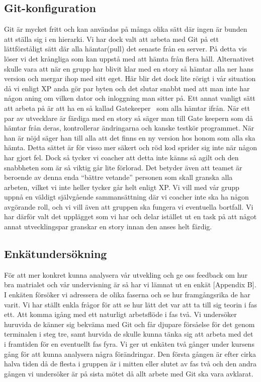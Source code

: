 \subsection{Git-konfiguration}

Git är mycket fritt och kan användas på många olika sätt där ingen är bunden att ställa sig i en hierarki. Vi har dock valt att arbeta med Git på ett lättförståligt sätt där alla hämtar(pull) det senaste från en server. På detta vis löser vi det krångliga som kan uppstå med att hämta från flera håll. Alternativet skulle vara att när en grupp har blivit klar med en story så hämtar alla ner hans version och mergar ihop med sitt eget. Här blir det dock lite rörigt i vår situation då vi enligt XP anda gör par byten och det slutar snabbt med att man inte har någon aning om vilken dator och inloggning man sitter på. Ett annat vanligt sätt att arbeta på är att ha en så kallad Gatekeeper~\cite{Gatekeeper} som alla hämtar ifrån. När ett par av utvecklare är färdiga med en story så säger man till Gate keepern som då hämtar från deras, kontrollerar ändringarna och kanske testkör programmet. När han är nöjd säger han till alla att det finns en ny version hos honom som alla ska hämta. Detta sättet är för visso mer säkert och röd kod sprider sig inte när någon har gjort fel. Dock så tycker vi coacher att detta inte känns så agilt och den snabbheten som är så viktig går lite förlorad. Det betyder även att teamet är beroende av denna enda “bättre vetande” personen som skall granska alla arbeten, vilket vi inte heller tycker går helt enligt XP. Vi vill med vår grupp uppnå en väldigt självgående sammansättning där vi coacher inte ska ha någon avgörande roll, och vi vill även att gruppen ska fungera vi eventuella bortfall. 
Vi har därför valt det upplägget som vi har och delar istället ut en task på att något annat utvecklingspar granskar en story innan den anses helt färdig. 


\subsection{Enkätundersökning}

För att mer konkret kunna analysera vår utvekling och ge oss feedback om hur bra matrialet och vår undervisning är så har vi lämnat ut en enkät [Appendix B]. I enkäten försöker vi adressera de olika faserna och se hur framgångsrika de har varit. Vi har ställt enkla frågor för att se hur lätt det var att ta till sig teorin i fas ett. Att komma igång med ett naturligt arbetsflöde i fas två. Vi undersöker huruvida de känner sig bekväma med Git och får djupare försåelse för det genom terminalen i steg tre, samt hurvida de skulle kunna tänka sig att arbeta med det i framtiden för en eventuellt fas fyra. Vi ger ut enkäten två gånger under kursens gång för att kunna analysera några förändringar. Den första gången är efter cirka halva tiden då de flesta i gruppen är i mitten eller slutet av fas två och den andra gången vi undersöker är på sista mötet då allt arbete med Git ska vara avklarat. 
